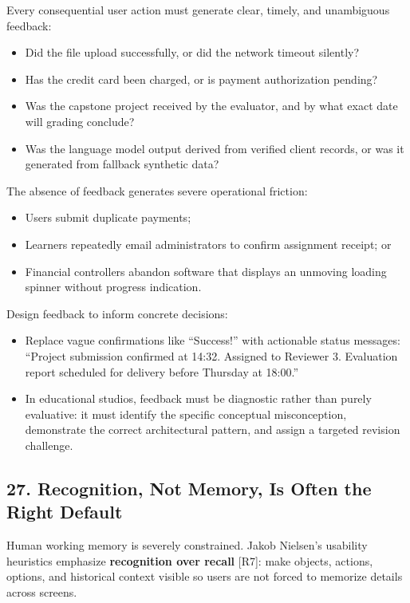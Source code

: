 Every consequential user action must generate clear, timely, and unambiguous feedback:
\begin{itemize}
    \item Did the file upload successfully, or did the network timeout silently?
    \item Has the credit card been charged, or is payment authorization pending?
    \item Was the capstone project received by the evaluator, and by what exact date will grading conclude?
    \item Was the language model output derived from verified client records, or was it generated from fallback synthetic data?
\end{itemize}

The absence of feedback generates severe operational friction:
\begin{itemize}
    \item Users submit duplicate payments;
    \item Learners repeatedly email administrators to confirm assignment receipt; or
    \item Financial controllers abandon software that displays an unmoving loading spinner without progress indication.
\end{itemize}

Design feedback to inform concrete decisions:
\begin{itemize}
    \item Replace vague confirmations like ``Success!'' with actionable status messages: ``Project submission confirmed at 14:32. Assigned to Reviewer 3. Evaluation report scheduled for delivery before Thursday at 18:00.''
    \item In educational studios, feedback must be diagnostic rather than purely evaluative: it must identify the specific conceptual misconception, demonstrate the correct architectural pattern, and assign a targeted revision challenge.
\end{itemize}

\subsection*{27. Recognition, Not Memory, Is Often the Right Default}

Human working memory is severely constrained. Jakob Nielsen's usability heuristics emphasize \textbf{recognition over recall} [R7]: make objects, actions, options, and historical context visible so users are not forced to memorize details across screens.

